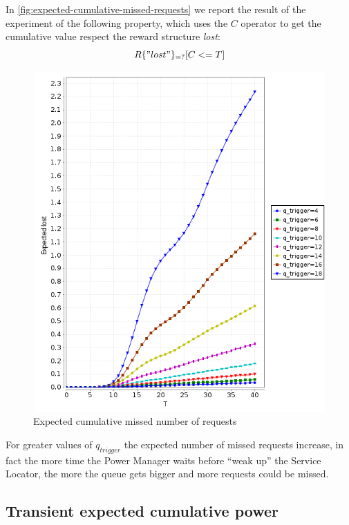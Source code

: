 In \autoref{fig:expected-cumulative-missed-requests} we report the
result of the experiment of the following property, which uses the $C$
operator to get the cumulative value respect the reward structure
\emph{lost}:
\begin{displaymath}
  R\{"lost"\}_{=?} [ C<=T ]
\end{displaymath}
\begin{figure}[htb]
  \centering
  \includegraphics[width=13cm,
  height=13cm]{quantitative-project/expected-missed-requests.png}
  \caption{Expected cumulative missed number of requests}
  \label{fig:expected-cumulative-missed-requests}
\end{figure}
For greater values of $q_{trigger}$ the expected number of missed
requests increase, in fact the more time the Power Manager waits
before ``weak up'' the Service Locator, the more the queue gets bigger
and more requests could be missed.

\subsection{Transient expected cumulative power }

